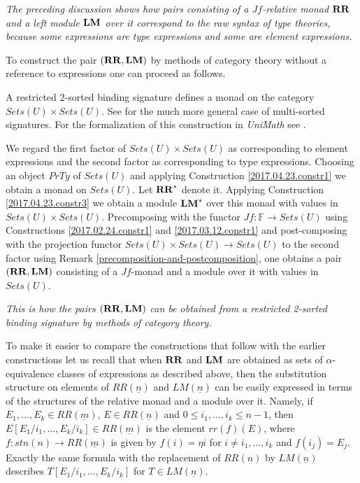 \documentclass[onecolumn,12pt]{amsart}
\numberwithin{proposition}{subsection}
\newcommand{\sr}{\rightarrow}
\newcommand{\uu}{\underline}
\newcommand{\RR}{{\bf RR}}
\newcommand{\LM}{{\bf LM}}
\newcommand{\FF}{{\mathbb F}}
\newcommand{\ff}[1]{\uu{#1}}
\begin{document}
{\em The preceding discussion shows how pairs consisting of a $Jf$-relative monad $\RR$
  and a left module $\LM$ over it correspond to the raw syntax of type theories,
  because some expressions are type expressions and some are element
  expressions.}

To construct the pair $(\RR,\LM)$ by methods of category theory without a
reference to expressions one can proceed as follows.

A restricted 2-sorted binding signature defines a monad on the category
$Sets(U)\times Sets(U)$.  See \cite{Zsido} for the much more general case of multi-sorted
signatures. For the formalization of this construction in {\em UniMath} see
\cite{AMM2017}.

We regard the first factor of $Sets(U)\times Sets(U)$ as corresponding to element expressions
and the second factor as corresponding to type expressions.
Choosing an object $PrTy$ of $Sets(U)$ and applying Construction
\ref{2017.04.23.constr1} we obtain a monad on $Sets(U)$. Let
$\RR^*$ denote it.  Applying Construction \ref{2017.04.23.constr3} we obtain a module
$\LM^*$ over this monad with values in $Sets(U) \times Sets(U)$.  Precomposing with the
functor $Jf:\FF\sr Sets(U)$ using Constructions \ref{2017.02.24.constr1} and
\ref{2017.03.12.constr1} and post-composing with the projection functor
$Sets(U) \times Sets (U) \to Sets(U)$ to the second factor using Remark \ref{precomposition-and-postcomposition},
one obtains a pair $(\RR,\LM)$ consisting of a $Jf$-monad and a
module over it with values in $Sets(U)$.

{\em This is how the pairs $(\RR,\LM)$ can be obtained from a restricted
  2-sorted binding signature by methods of category theory.}

To make it easier to compare the constructions that follow with the earlier
constructions let us recall that when $\RR$ and $\LM$ are obtained as sets
of $\alpha$-equivalence classes of expressions as described above, then the
substitution structure on elements of $RR(\ff{n})$ and $LM(\ff{n})$ can be
easily expressed in terms of the structures of the relative monad and a module
over it.  Namely, if $E_1,\dots,E_k\in RR(\ff{m})$, 
$E\in RR(\ff{n})$ and $0\le i_1,\dots,i_k\le n-1$, then 
$E[E_1/i_1,\dots,E_k/i_k]\in RR(\ff{m})$ is the element $rr(f)(E)$, where $f:stn(n)\sr RR(\ff{m})$ is given
by $f(i)=\eta{i}$ for $i\ne i_1,\dots,i_k$ and $f(i_j)=E_j$. Exactly the same
formula with the replacement of $RR(n)$ by $LM(\ff{n})$ describes
$T[E_1/i_1,\dots,E_k/i_k]$ for $T\in LM(\ff{n})$.
\end{document}
